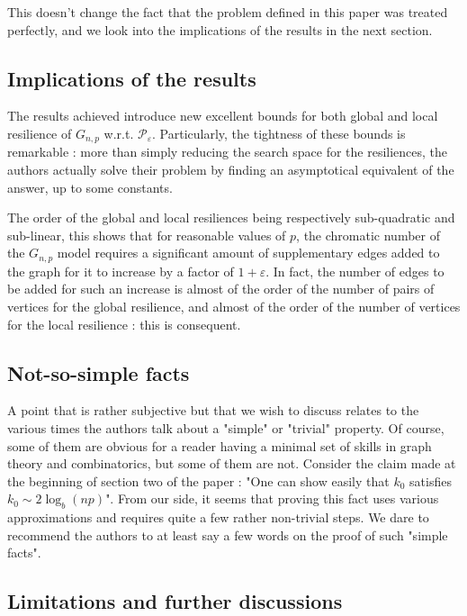 \documentclass[10pt,journal,a4paper]{IEEEtran}
\theoremstyle{definition}   %
\begin{document}
This doesn't change the fact that the problem defined in this paper was treated perfectly, and we look into the implications of the results in the next section.

\subsection{Implications of the results}

The results achieved introduce new excellent bounds for both global and local resilience of $G_{n, p}$ w.r.t. $\mathcal{P}_\varepsilon$. Particularly, the tightness of these bounds is remarkable : more than simply reducing the search space for the resiliences, the authors actually solve their problem by finding an asymptotical equivalent of the answer, up to some constants.

The order of the global and local resiliences being respectively sub-quadratic and sub-linear, this shows that for reasonable values of $p$, the chromatic number of the $G_{n, p}$ model requires a significant amount of supplementary edges added to the graph for it to increase by a factor of $1 + \varepsilon$. In fact, the number of edges to be added for such an increase is almost of the order of the number of pairs of vertices for the global resilience, and almost of the order of the number of vertices for the local resilience : this is consequent.

\subsection{Not-so-simple facts}

A point that is rather subjective but that we wish to discuss relates to the various times the authors talk about a "simple" or "trivial" property. Of course, some of them are obvious for a reader having a minimal set of skills in graph theory and combinatorics, but some of them are not. Consider the claim made at the beginning of section two of the paper : "One can show easily that $k_0$ satisfies $k_0 \sim 2 \log_b(np)$". From our side, it seems that proving this fact uses various approximations and requires quite a few rather non-trivial steps. We dare to recommend the authors to at least say a few words on the proof of such "simple facts".

\subsection{Limitations and further discussions}
\end{document}
